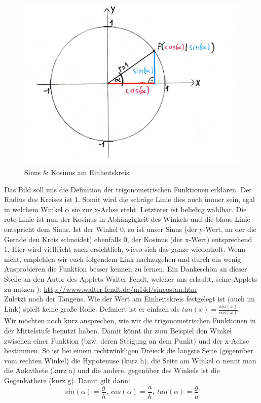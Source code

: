    \begin{figure}[h]
   \centering
   \includegraphics[scale=0.2]{Images/Einheitskreis.jpeg}
   \caption{Sinus \& Kosinus am Einheitskreis}
   \end{figure}
  
   Das Bild soll uns die Definition der trigonometrischen Funktionen erklären. Der Radius des Kreises ist 1. Somit wird die schräge Linie dies auch immer sein, egal in welchem Winkel \(\alpha\) sie zur x-Achse steht. Letzterer ist beliebig wählbar. Die rote Linie ist nun der Kosinus in Abhängigkeit des Winkels und die blaue Linie entspricht dem Sinus. Ist der Winkel 0, so ist unser Sinus (der y-Wert, an der die Gerade den Kreis schneidet) ebenfalls 0, der Kosinus (der x-Wert) entsprechend 1. Hier wird vielleicht auch ersichtlich, wieso sich das ganze wiederholt. Wenn nicht, empfehlen wir euch folgendem Link nachzugehen und durch ein wenig Ausprobieren die Funktion besser kennen zu lernen. Ein Dankeschön an dieser Stelle an den Autor des Applets Walter Fendt, welcher uns erlaubt, seine Applets zu nutzen ): \url{http://www.walter-fendt.de/m14d/sincostan.htm}\\
Zuletzt noch der Tangens. Wie der Wert am Einheitskreis festgelegt ist (auch im Link) spielt keine große Rolle. Definiert ist er einfach als \(tan(x)=\frac{sin(x)}{cos(x)}\).\\
Wir möchten noch kurz ansprechen, wie wir die trigonometrischen Funktionen in der Mittelstufe benutzt haben. Damit könnt ihr zum Beispiel den Winkel zwischen einer Funktion (bzw. deren Steigung an dem Punkt) und der x-Achse bestimmen. So ist bei einem rechtwinkligen Dreieck die längste Seite (gegenüber vom rechten Winkel) die Hypotenuse (kurz h), die Seite am Winkel \(\alpha\) nennt man die Ankathete (kurz a) und die andere, gegenüber des Winkels ist die Gegenkathete (kurz g). Damit gilt dann:
\[sin(\alpha)=\frac{g}{h},\ cos(\alpha)=\frac{a}{h},\ tan(\alpha)=\frac{g}{a}\]
